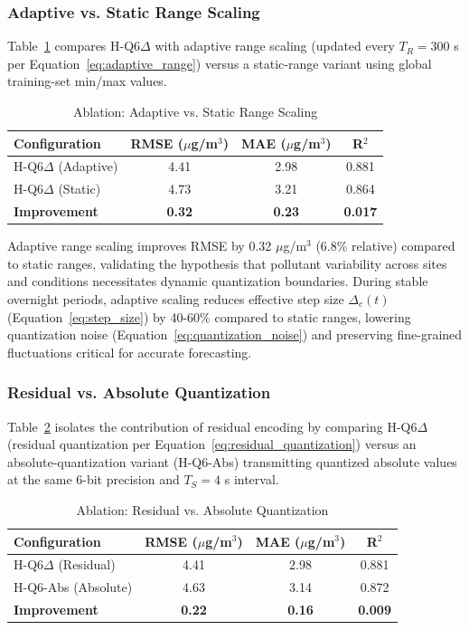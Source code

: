 \subsubsection{Adaptive vs. Static Range Scaling}

Table~\ref{tab:ablation_range} compares H-Q6$\Delta$ with adaptive range scaling (updated every $T_R = 300$ s per Equation~\eqref{eq:adaptive_range}) versus a static-range variant using global training-set min/max values.

\begin{table}[h]
\centering
\caption{Ablation: Adaptive vs. Static Range Scaling}
\label{tab:ablation_range}
\begin{tabular}{lccc}
\toprule
\textbf{Configuration} & \textbf{RMSE ($\mu$g/m$^3$)} & \textbf{MAE ($\mu$g/m$^3$)} & \textbf{R$^2$} \\
\midrule
H-Q6$\Delta$ (Adaptive) & 4.41 & 2.98 & 0.881 \\
H-Q6$\Delta$ (Static) & 4.73 & 3.21 & 0.864 \\
\midrule
\textbf{Improvement} & \textbf{0.32} & \textbf{0.23} & \textbf{0.017} \\
\bottomrule
\end{tabular}
\end{table}

Adaptive range scaling improves RMSE by 0.32 $\mu$g/m$^3$ (6.8\% relative) compared to static ranges, validating the hypothesis that pollutant variability across sites and conditions necessitates dynamic quantization boundaries. During stable overnight periods, adaptive scaling reduces effective step size $\Delta_c(t)$ (Equation~\eqref{eq:step_size}) by 40-60\% compared to static ranges, lowering quantization noise (Equation~\eqref{eq:quantization_noise}) and preserving fine-grained fluctuations critical for accurate forecasting.

\subsubsection{Residual vs. Absolute Quantization}

Table~\ref{tab:ablation_residual} isolates the contribution of residual encoding by comparing H-Q6$\Delta$ (residual quantization per Equation~\eqref{eq:residual_quantization}) versus an absolute-quantization variant (H-Q6-Abs) transmitting quantized absolute values at the same 6-bit precision and $T_S = 4$ s interval.

\begin{table}[h]
\centering
\caption{Ablation: Residual vs. Absolute Quantization}
\label{tab:ablation_residual}
\begin{tabular}{lccc}
\toprule
\textbf{Configuration} & \textbf{RMSE ($\mu$g/m$^3$)} & \textbf{MAE ($\mu$g/m$^3$)} & \textbf{R$^2$} \\
\midrule
H-Q6$\Delta$ (Residual) & 4.41 & 2.98 & 0.881 \\
H-Q6-Abs (Absolute) & 4.63 & 3.14 & 0.872 \\
\midrule
\textbf{Improvement} & \textbf{0.22} & \textbf{0.16} & \textbf{0.009} \\
\bottomrule
\end{tabular}
\end{table}

